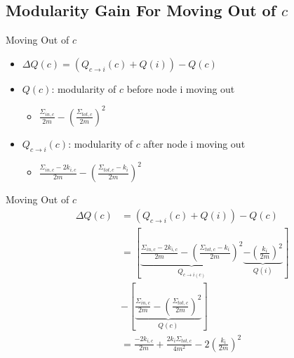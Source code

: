 \documentclass[12pt]{beamer}
\begin{document}
\subsection{Modularity Gain For Moving Out of $c$}
\begin{frame}{Moving Out of $c$}
\begin{itemize}
    \item $\Delta Q(c) = (Q_{c\to i}(c)+Q(i)) -  Q(c)$
    \item $Q(c)$: modularity of $c$ before node i moving out
    \begin{itemize}
        \Large
        \item $\frac{\Sigma_{in, c}}{2m} - (\frac{\Sigma_{tot, c}}{2m})^2$
    \end{itemize}
\item $Q_{c\to i}(c)$: modularity of $c$ after node i moving out
    \begin{itemize}
        \Large
        \item $\frac{\Sigma_{in, c} - 2k_{i, c}}{2m} - (\frac{\Sigma_{tot, c}-k_i}{2m})^2$
    \end{itemize}
\end{itemize}
\end{frame}

\begin{frame}{Moving Out of $c$}
\begin{align*}
\Delta Q(c)
    &= (Q_{c\to i}(c)+Q(i)) -  Q(c) \\
    &= [ \underbrace{\frac{\Sigma_{in, c} - 2k_{i, c}}{2m} - (\frac{\Sigma_{tot, c}-k_i}{2m})^2}_{Q_{c\to i(c)}} \underbrace{- (\frac{k_i}{2m})^2}_{Q(i)} ] \\
        &-  [ \underbrace{\frac{\Sigma_{in, c}}{2m} - (\frac{\Sigma_{tot, c}}{2m})^2}_{Q(c)} ] \\
        &= \frac{-2k_{i, c}}{2m} + \frac{2k_i\Sigma_{tot, c}}{4m^2} - 2(\frac{k_i}{2m})^2
\end{align*}
\end{frame}
\end{document}
